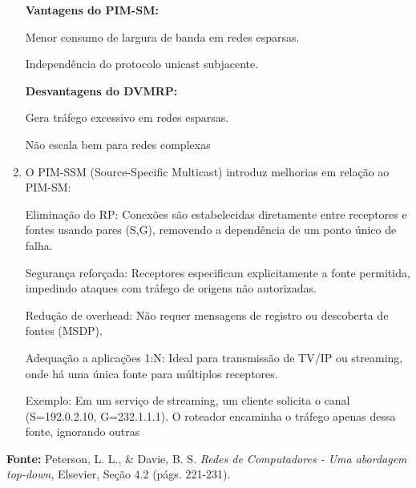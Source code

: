 \begin{enumerate}[label=\alph*.]
\textbf{Vantagens do PIM-SM:}

Menor consumo de largura de banda em redes esparsas.

Independência do protocolo unicast subjacente.

\textbf{Desvantagens do DVMRP:}

Gera tráfego excessivo em redes esparsas.

Não escala bem para redes complexas

\item O PIM-SSM (Source-Specific Multicast) introduz melhorias em relação ao PIM-SM:

Eliminação do RP: Conexões são estabelecidas diretamente entre receptores e fontes usando pares (S,G), removendo a dependência de um ponto único de falha.

Segurança reforçada: Receptores especificam explicitamente a fonte permitida, impedindo ataques com tráfego de origens não autorizadas.

Redução de overhead: Não requer mensagens de registro ou descoberta de fontes (MSDP).

Adequação a aplicações 1:N: Ideal para transmissão de TV/IP ou streaming, onde há uma única fonte para múltiplos receptores.

Exemplo: Em um serviço de streaming, um cliente solicita o canal (S=192.0.2.10, G=232.1.1.1). O roteador encaminha o tráfego apenas dessa fonte, ignorando outras
\end{enumerate}

\textbf{Fonte:} Peterson, L. L., \& Davie, B. S. \textit{Redes de Computadores - Uma abordagem top-down}, Elsevier, Seção 4.2 (págs. 221-231).